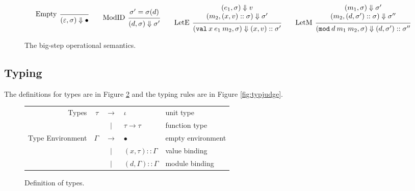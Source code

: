 \documentclass{article}
\theoremstyle{definition}
\newcommand*{\vbar}{|}
\newcommand*{\cons}{::}
\newcommand*{\modid}{d}
\newcommand*{\ctx}{\sigma}
\newcommand*{\semarrow}{\Downarrow}
\newcommand*{\Lete}{\mathtt{val}}
\newcommand*{\Letm}{\mathtt{mod}}
\begin{document}
\begin{figure}[h!]
	\[
		\begin{prooftree}
			\infer[left label=Empty]0{
			(\varepsilon, \ctx)
			\semarrow
			\bullet
			}
		\end{prooftree}\qquad
		\begin{prooftree}
			\hypo{\ctx'=\ctx(\modid)}
			\infer[left label=ModID]1{
			(\modid, \ctx)
			\semarrow
			\ctx'
			}
		\end{prooftree}\qquad
		\begin{prooftree}
			\hypo{
				\begin{matrix}
					(e_{1}, \ctx)
					\semarrow
					v \\
					(m_{2}, (x, v)\cons \ctx)
					\semarrow
					\ctx'
				\end{matrix}
			}
			\infer[left label=LetE]1{
			(\Lete\:x\:e_1\:m_2, \ctx)
			\semarrow
			(x,v)\cons\ctx'
			}
		\end{prooftree}\qquad
		\begin{prooftree}
			\hypo{
				\begin{matrix}
					(m_{1}, \ctx)
					\semarrow
					\ctx' \\
					(m_{2}, (\modid, \ctx')\cons \ctx)
					\semarrow
					\ctx''
				\end{matrix}
			}
			\infer[left label=LetM]1{
			(\Letm\:\modid\:m_{1}\:m_{2}, \ctx)
			\semarrow
			(\modid,\ctx')\cons\ctx''
			}
		\end{prooftree}
	\]
	\caption{The big-step operational semantics.}
	\label{fig:simpreach}
\end{figure}
\subsection{Typing}
The definitions for types are in Figure \ref{fig:typdom} and the typing rules are in Figure \ref{fig:typjudge}.

\begin{figure}[h!]
	\centering
	\begin{tabular}{rrcll}
		Types            & $\tau$   & $\rightarrow$ & $\iota$                       & unit type         \\
		                 &          & $\vbar$       & $\tau\rightarrow\tau$         & function type     \\
		Type Environment & $\Gamma$ & $\rightarrow$ & $\bullet$                     & empty environment \\
		                 &          & $\vbar$       & $(x,\tau)\cons \Gamma$        & value binding     \\
		                 &          & $\vbar$       & $(\modid,\Gamma)\cons \Gamma$ & module binding
	\end{tabular}
	\caption{Definition of types.}
	\label{fig:typdom}
\end{figure}
\end{document}

